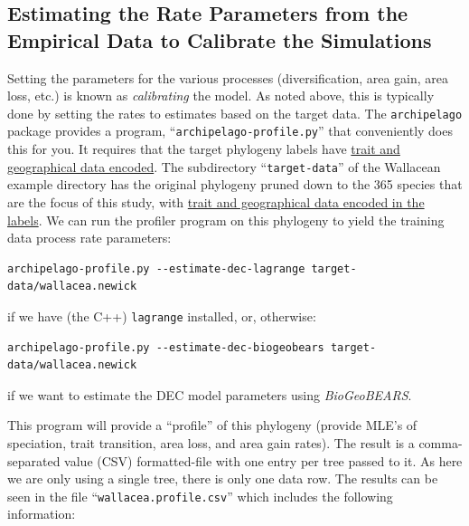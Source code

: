 \documentclass[11pt,openany]{memoir} %
\newcommand{\archipelagoPackage}{\texttt{archipelago}\xspace}
\begin{document}
\subsection{Estimating the Rate Parameters from the Empirical Data to Calibrate the Simulations}

Setting the parameters for the various processes (diversification, area gain, area loss, etc.) is known as \textit{calibrating} the model.
As noted above, this is typically done by setting the rates to estimates based on the target data.
The \archipelagoPackage package provides a program, ``\texttt{archipelago-profile.py}'' that conveniently does this for you.
It requires that the target phylogeny labels have \hyperref[sec:workflow-encoding-the-target-data]{trait and geographical data encoded}.
The subdirectory ``\texttt{target-data}'' of the Wallacean example directory has the original phylogeny pruned down to the 365 species that are the focus of this study, with \hyperref[sec:workflow-encoding-the-target-data]{trait and geographical data encoded in the labels}.
We can run the profiler program on this phylogeny to yield the training data process rate parameters:
\begin{lstlisting}
archipelago-profile.py --estimate-dec-lagrange target-data/wallacea.newick
\end{lstlisting}
if we have (the C++) \texttt{lagrange} installed, or, otherwise:
\begin{lstlisting}
archipelago-profile.py --estimate-dec-biogeobears target-data/wallacea.newick
\end{lstlisting}
if we want to estimate the DEC model parameters using \textit{BioGeoBEARS}.

This program will provide a ``profile'' of this phylogeny (provide MLE's of speciation, trait transition, area loss, and area gain rates).
The result is a comma-separated value (CSV) formatted-file with one entry per tree passed to it.
As here we are only using a single tree, there is only one data row.
The results can be seen in the file ``\texttt{wallacea.profile.csv}'' which includes the following information:
\end{document}
